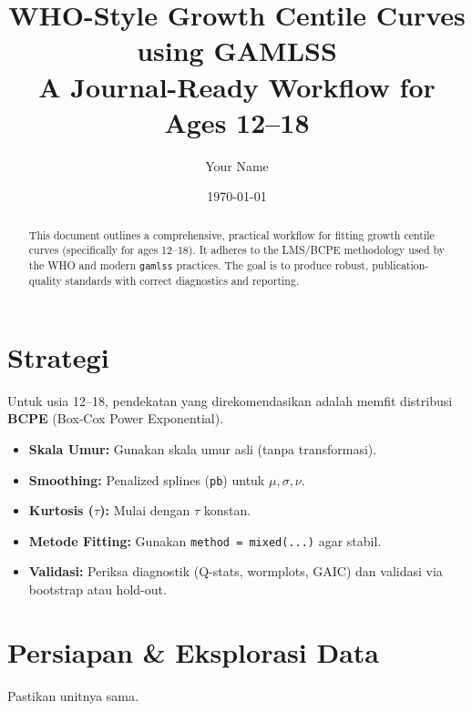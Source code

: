 \documentclass[11pt, a4paper]{article}
\title{\textbf{WHO-Style Growth Centile Curves using GAMLSS}\\ \large A Journal-Ready Workflow for Ages 12--18}
\author{Your Name} %
\date{\today}
\begin{document}
\maketitle

\begin{abstract}
\noindent This document outlines a comprehensive, practical workflow for fitting growth centile curves (specifically for ages 12--18). It adheres to the LMS/BCPE methodology used by the WHO and modern \texttt{gamlss} practices. The goal is to produce robust, publication-quality standards with correct diagnostics and reporting.
\end{abstract}

\tableofcontents
\newpage

\section{Strategi}
Untuk usia 12--18, pendekatan yang direkomendasikan adalah memfit distribusi \textbf{BCPE} (Box-Cox Power Exponential). 
\begin{itemize}
    \item \textbf{Skala Umur:} Gunakan skala umur asli (tanpa transformasi).
    \item \textbf{Smoothing:} Penalized splines (\texttt{pb}) untuk $\mu, \sigma, \nu$.
    \item \textbf{Kurtosis ($\tau$):} Mulai dengan $\tau$ konstan.
    \item \textbf{Metode Fitting:} Gunakan \texttt{method = mixed(...)} agar stabil.
    \item \textbf{Validasi:} Periksa diagnostik (Q-stats, wormplots, GAIC) dan validasi via bootstrap atau hold-out.
\end{itemize}

\section{Persiapan \& Eksplorasi Data}
Pastikan unitnya sama.
\end{document}
